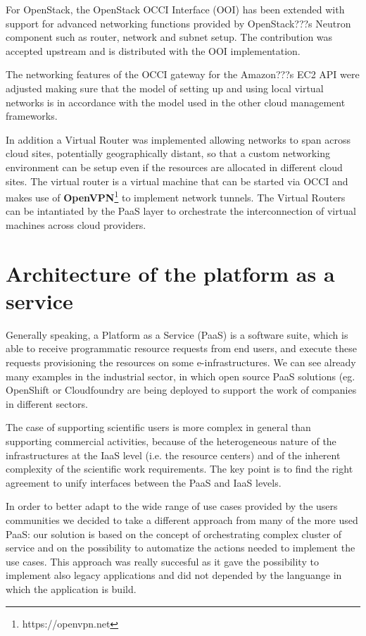 \documentclass{article}
\begin{document}
For OpenStack, the OpenStack OCCI Interface (OOI) has been extended with support for advanced networking functions provided by OpenStack???s Neutron component such as router, network and subnet setup. The contribution was accepted upstream and is distributed with the OOI implementation.

The networking features of the OCCI gateway for the Amazon???s EC2 API were adjusted making sure that the model of setting up and using local virtual networks is in accordance with the model used in the other cloud management frameworks.

In addition a Virtual Router was implemented allowing networks to span across cloud  sites,  potentially geographically  distant,  so  that  a custom  networking  environment  can  be  setup  even if the resources are allocated in different cloud sites. The virtual router is a virtual machine that can be started via OCCI and makes use of {\bf OpenVPN}\footnote{https://openvpn.net} to implement network tunnels. The Virtual Routers can be intantiated by the PaaS layer to orchestrate the interconnection of virtual machines across cloud providers.





\section{Architecture of the platform as a service}
\label{sec:paas}

Generally speaking, a Platform as a Service (PaaS) is a software suite, which is able to receive programmatic resource requests from end users, and execute these requests provisioning the resources on some e-infrastructures. We can see already many examples in the industrial sector, in which open source PaaS solutions (eg. OpenShift\cite{OPENSHIFT} or Cloudfoundry are being deployed to support the work of companies in different sectors.

The case of supporting scientific users is more complex in general than supporting commercial activities, because of the heterogeneous nature of the infrastructures at the IaaS level (i.e. the resource centers) and of the inherent complexity of the scientific work requirements. The key point is to find the right agreement to unify interfaces between the PaaS and IaaS levels.

In order to better adapt to the wide range of use cases provided by the users communities we decided to take a different approach from many of the more used PaaS: our solution is based on the concept of orchestrating complex cluster of service and on the possibility to automatize the actions needed to implement the use cases. 
This approach was really succesful as it gave the possibility to implement also legacy applications and did not depended by the languange in which the application is build. 
 
\end{document}

